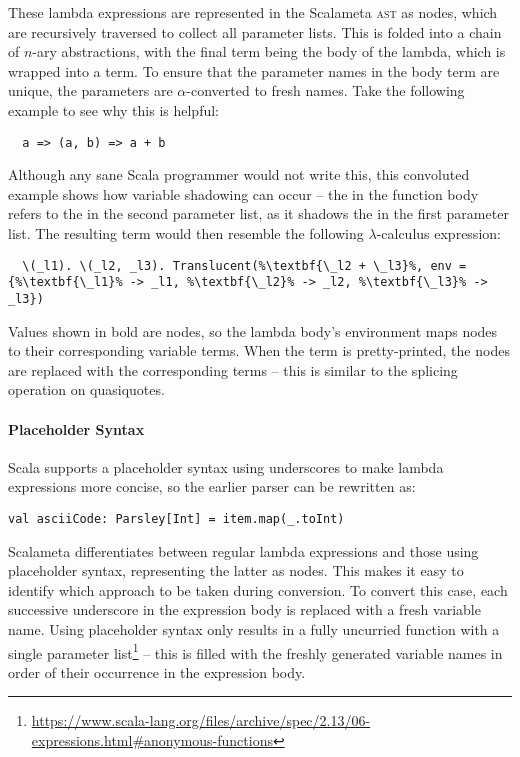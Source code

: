 \documentclass[../../main.tex]{subfiles}
\begin{document}
These lambda expressions are represented in the Scalameta \textsc{ast} as  nodes, which are recursively traversed to collect all parameter lists.
This is folded into a chain of $n$-ary abstractions, with the final term being the body of the lambda, which is wrapped into a  term.
To ensure that the parameter names in the  body term are unique, the parameters are $\alpha$-converted to fresh names.
Take the following example to see why this is helpful:
\begin{verbatim}
  a => (a, b) => a + b
\end{verbatim}
Although any sane Scala programmer would not write this, this convoluted example shows how variable shadowing can occur -- the  in the function body refers to the  in the second parameter list, as it shadows the  in the first parameter list.
The resulting  term would then resemble the following $\lambda$-calculus expression:
\begin{lstlisting}
  \(_l1). \(_l2, _l3). Translucent(%\textbf{\_l2 + \_l3}%, env = {%\textbf{\_l1}% -> _l1, %\textbf{\_l2}% -> _l2, %\textbf{\_l3}% -> _l3})
\end{lstlisting}
Values shown in bold are  nodes, so the lambda body's environment maps  nodes to their corresponding variable terms.
When the term is pretty-printed, the  nodes are replaced with the corresponding  terms -- this is similar to the splicing operation on quasiquotes.

\paragraph{Placeholder Syntax}
Scala supports a placeholder syntax using underscores to make lambda expressions more concise, so the earlier parser can be rewritten as:
\begin{verbatim}
val asciiCode: Parsley[Int] = item.map(_.toInt)
\end{verbatim}

Scalameta differentiates between regular lambda expressions and those using placeholder syntax, representing the latter as  nodes.
This makes it easy to identify which approach to be taken during conversion.
To convert this case, each successive underscore in the expression body is replaced with a fresh variable name.
Using placeholder syntax only results in a fully uncurried function with a single parameter list\footnote{\url{https://www.scala-lang.org/files/archive/spec/2.13/06-expressions.html#anonymous-functions}} -- this is filled with the freshly generated variable names in order of their occurrence in the expression body.
\end{document}
